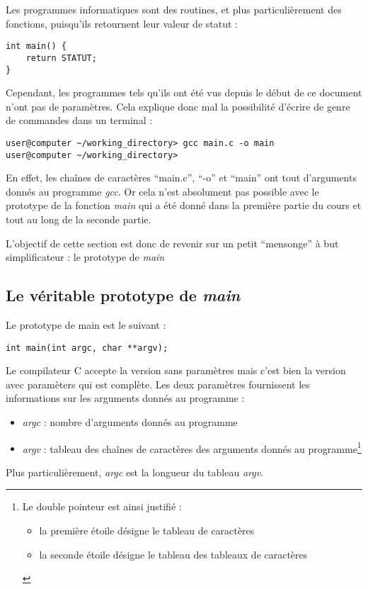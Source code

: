 \documentclass[../../../main.tex]{subfiles}
\begin{document}
Les programmes informatiques sont des routines, et plus particulièrement des fonctions, puisqu'ils retournent leur valeur de statut :
\begin{verbatim}
int main() {
	return STATUT;
}
\end{verbatim}
Cependant, les programmes tels qu'ils ont été vus depuis le début de ce document n'ont pas de paramètres. Cela explique donc mal la possibilité d'écrire de genre de commandes dans un terminal :
\begin{verbatim}
user@computer ~/working_directory> gcc main.c -o main
user@computer ~/working_directory>
\end{verbatim}
En effet, les chaînes de caractères ``main.c'', ``-o'' et ``main'' ont tout d'arguments donnés au programme \textit{gcc}. Or cela n'est absolument pas possible avec le prototype de la fonction \textit{main} qui a été donné dans la première partie du cours et tout au long de la seconde partie.

L'objectif de cette section est donc de revenir sur un petit ``mensonge'' à but simplificateur : le prototype de \textit{main}
\subsection{Le véritable prototype de \textit{main}}
Le prototype de main est le suivant :
\begin{verbatim}
int main(int argc, char **argv);
\end{verbatim}
Le compilateur C accepte la version sans paramètres mais c'est bien la version avec paramèters qui est complète. Les deux paramètres fournissent les informations sur les arguments donnés au programme :
\begin{itemize}
	\item \textit{argc} : nombre d'arguments donnés au programme
	\item \textit{argv} : tableau des chaînes de caractères des arguments donnés au programme\footnote{Le double pointeur est ainsi justifié : \begin{itemize}
	\item la première étoile désigne le tableau de caractères
	\item la seconde étoile désigne le tableau des tableaux de caractères
	\end{itemize}}
\end{itemize}
Plus particulièrement, \textit{argc} est la longueur du tableau \textit{argv}.
\end{document}
